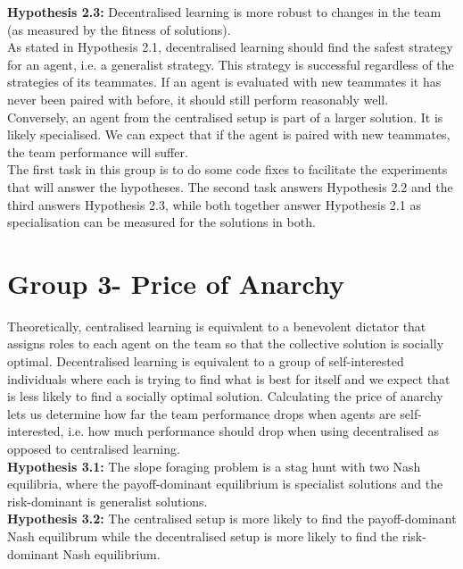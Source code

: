 \documentclass[12pt]{article}
\begin{document}
\textbf{Hypothesis 2.3:} Decentralised learning is more robust to changes in the team (as measured by the fitness of solutions).\\

As stated in Hypothesis 2.1, decentralised learning should find the safest strategy for an agent, i.e. a generalist strategy. This strategy is successful regardless of the strategies of its teammates. If an agent is evaluated with new teammates it has never been paired with before, it should still perform reasonably well. \\

Conversely, an agent from the centralised setup is part of a larger solution. It is likely specialised. We can expect that if the agent is paired with new teammates, the team performance will suffer. \\

The first task in this group is to do some code fixes to facilitate the experiments that will answer the hypotheses.
The second task answers Hypothesis 2.2 and the third answers Hypothesis 2.3, while both together answer Hypothesis 2.1 as specialisation can be measured for the solutions in both.


\section{Group 3- Price of Anarchy}\label{group_3}

Theoretically, centralised learning is equivalent to a benevolent dictator that assigns roles to each agent on the team so that the collective solution is socially optimal. 
Decentralised learning is equivalent to a group of self-interested individuals where each is trying to find what is best for itself and we expect that is less likely to find a socially optimal solution. 
Calculating the price of anarchy lets us determine how far the team performance drops when agents are self-interested, i.e. how much performance should drop when using decentralised as opposed to centralised learning.\\

\textbf{Hypothesis 3.1:} The slope foraging problem is a stag hunt with two Nash equilibria, where the payoff-dominant equilibrium is specialist solutions and the risk-dominant is generalist solutions.\\

\textbf{Hypothesis 3.2:} The centralised setup is more likely to find the payoff-dominant Nash equilibrum while the decentralised setup is more likely to find the risk-dominant Nash equilibrium.\\
\end{document}
